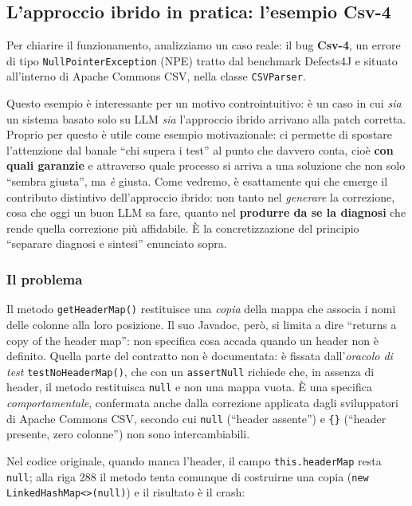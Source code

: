 \subsection{L'approccio ibrido in pratica: l'esempio Csv-4}

Per chiarire il funzionamento, analizziamo un caso reale: il bug \textbf{Csv-4}, un errore
di tipo \texttt{NullPointerException} (NPE) tratto dal benchmark Defects4J e situato
all'interno di Apache Commons CSV, nella classe \texttt{CSVParser}.

Questo esempio è interessante per un motivo controintuitivo: è un caso in cui \emph{sia}
un sistema basato solo su LLM \emph{sia} l'approccio ibrido arrivano alla patch corretta.
Proprio per questo è utile come esempio motivazionale: ci permette di spostare l'attenzione
dal banale ``chi supera i test'' al punto che davvero conta, cioè \textbf{con quali garanzie}
e attraverso quale processo si arriva a una soluzione che non solo ``sembra giusta'', ma
\emph{è} giusta. Come vedremo, è esattamente qui che emerge il contributo distintivo
dell'approccio ibrido: non tanto nel \emph{generare} la correzione, cosa che oggi un buon
LLM sa fare, quanto nel \textbf{produrre da se la diagnosi} che rende quella correzione
più affidabile. È la concretizzazione del principio ``separare diagnosi e sintesi'' enunciato sopra.

\subsubsection{Il problema}

Il metodo \texttt{getHeaderMap()} restituisce una \emph{copia} della mappa che associa i
nomi delle colonne alla loro posizione. Il suo Javadoc, però, si limita a dire ``returns a copy
of the header map'': non specifica cosa accada quando un header non è definito. Quella parte del
contratto non è documentata: è fissata dall'\emph{oracolo di test} \texttt{testNoHeaderMap()},
che con un \texttt{assertNull} richiede che, in assenza di header, il metodo restituisca
\texttt{null} e non una mappa vuota. È una specifica \emph{comportamentale}, confermata anche
dalla correzione applicata dagli sviluppatori di Apache Commons CSV, secondo cui \texttt{null}
(``header assente'') e \texttt{\{\}} (``header presente, zero colonne'') non sono intercambiabili.

Nel codice originale, quando manca l'header, il campo \texttt{this.headerMap} resta
\texttt{null}; alla riga 288 il metodo tenta comunque di costruirne una copia
(\texttt{new LinkedHashMap<>(null)}) e il risultato è il crash:

